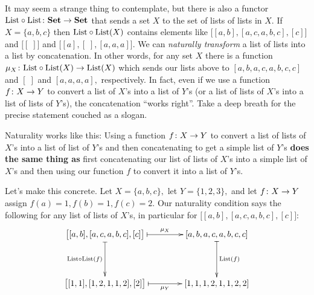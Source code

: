 \documentclass[CT4S-EN-RU]{subfiles}
\begin{document}
\begin{blockENG}
It may seem a strange thing to contemplate, but there is also a functor $\textnormal{List}\circ\textnormal{List}\colon{\mathbf{Set}}\rightarrow{\mathbf{Set}}$ that sends a set $X$ to the set of lists of lists in $X.$ If $X=\{a,b,c\}$ then $\textnormal{List}\circ\textnormal{List}(X)$ contains elements like $\big[[a,b],[a,c,a,b,c],[c]\big]$ and $\big[[\;]\big]$ and $\big[[a],[\;],[a,a,a]\big].$ We can {\em naturally transform} a list of lists into a list by concatenation. In other words, for any set $X$ there is a function $\mu_X\colon\textnormal{List}\circ\textnormal{List}(X)\rightarrow\textnormal{List}(X)$ which sends our lists above to $[a,b,a,c,a,b,c,c]$ and $[\;]$ and $[a,a,a,a],$ respectively. In fact, even if we use a function $f\colon X\rightarrow Y$ to convert a list of $X$'s into a list of $Y$'s (or a list of lists of $X$'s into a list of lists of $Y$'s), the concatenation “works right”. Take a deep breath for the precise statement couched as a slogan.
\end{blockENG}

\begin{blockRUS}
\end{blockRUS}

\begin{sloganENG}
Naturality works like this: Using a function $f\colon X\rightarrow Y$ to convert a list of lists of $X$'s into a list of list of $Y$'s and then concatenating to get a simple list of $Y$'s {\bf does the same thing as} first concatenating our list of lists of $X$'s into a simple list of $X$'s and then using our function $f$ to convert it into a list of $Y$'s.
\end{sloganENG}

\begin{sloganRUS}
\end{sloganRUS}

\begin{blockENG}
Let's make this concrete. Let $X=\{a,b,c\},$ let $Y=\{1,2,3\},$ and let $f\colon X\rightarrow Y$ assign $f(a)=1, f(b)=1, f(c)=2.$ Our naturality condition says the following for any list of lists of $X$'s, in particular for $\big[[a,b],[a,c,a,b,c],[c]\big]$:
$$\xymatrix@=40pt{
\big[[a,b],[a,c,a,b,c],[c]\big]\ar@{|->}[r]^-{\mu_X}\ar@{|->}[d]_{\List\circ\List(f)}&[a,b,a,c,a,b,c,c]\ar@{|->}[d]^{\List(f)}\\
\big[[1,1],[1,2,1,1,2],[2]\big]\ar@{|->}[r]_-{\mu_Y}&[1,1,1,2,1,1,2,2]
}
$$
\end{blockENG}

\begin{blockRUS}
\end{blockRUS}
\end{document}
